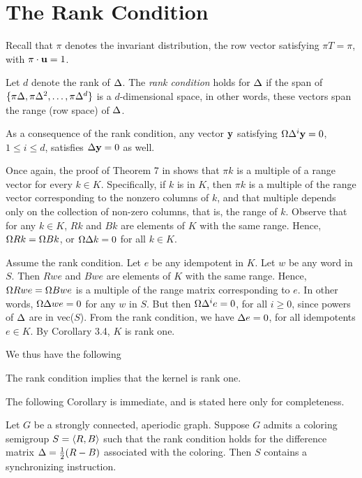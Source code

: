 

\section{The Rank Condition}   %


Recall that  $\pi$ denotes the invariant distribution, the row vector satisfying  $\pi T = \pi$, with  $\pi \cdot \mathbf u = 1$.


\begin{definition}  \label{defn:5.2}

Let $d$ denote the rank of  $\Delta$.  
The \textit{rank condition} holds for $\Delta$ if the span of $\{\pi\Delta,\pi\Delta^2,\ldots,\pi\Delta^d\}$ is a $d$-dimensional space, in other words, these vectors span the range (row space) of  $\Delta$. 
\end{definition}


As a consequence of the rank condition, any vector $\mathbf y$ satisfying  $\Omega\Delta^i\mathbf y=0$,  $1 \le i \le d$, satisfies $\Delta\mathbf y=0$ as well. 


Once again, the proof of Theorem 7 in \cite{BM} shows that $\pi k$ is a multiple of a range vector for every $k \in K$.  
Specifically, if $k$ is in $K$, then $\pi k$ is a multiple of the range vector corresponding to the nonzero columns of $k$, and that multiple depends only on the collection of non-zero columns, that is, the range of $k$.  
Observe that for any $k \in K$, $Rk$  and  $Bk$ are elements of $K$ with the same range.  
Hence, $\Omega Rk=\Omega Bk$, or $\Omega\Delta k = 0$ for all  $k \in K$.


Assume the rank condition.  
Let $e$ be any idempotent in $K$. 
Let $w$ be any word in $S$.  
Then $Rwe$ and $Bwe$ are elements of $K$ with the same range.  
Hence, $\Omega Rwe = \Omega Bwe$ is a multiple of the range matrix corresponding to $e$. 
In other words, $\Omega\Delta we=0$ for any $w$ in $S$. 
But then $\Omega\Delta^ie=0$, for all $i \ge 0$,  since powers of $\Delta$ are in vec($S$). 
From the rank condition, we have $\Delta e=0$, for all idempotents  $e \in K$.  
By Corollary 3.4, $K$ is rank one.


We thus have the following


\begin{theorem}  	\label{thm:5.1}
The rank condition implies that the kernel is rank one.
\end{theorem}


The following Corollary is immediate, and is stated here only for completeness.


\begin{corollary}  	\label{cor:5.4} 
Let $G$ be a strongly connected, aperiodic graph.  
Suppose $G$ admits a coloring semigroup $S=\langle R,B \rangle$ such that the rank condition holds for the difference matrix $\Delta= \frac{1}{2}(R-B)$ associated with the coloring.  
Then $S$ contains a synchronizing instruction.
\end{corollary}
